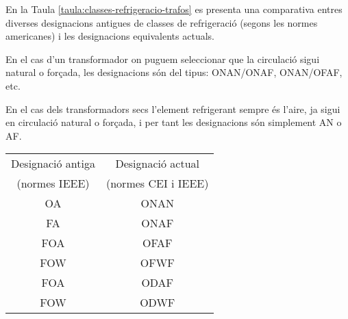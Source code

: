 En la Taula \vref{taula:classes-refrigeracio-trafos} es presenta una
comparativa entres diverses designacions antigues de classes de
refrigeració (segons les normes americanes) i les designacions
equivalents actuals.

En el cas d'un transformador on puguem seleccionar que la circulació
sigui natural o forçada,
les designacions són del tipus: ONAN/ONAF, ONAN/OFAF, etc.

En el cas dels transformadors secs l'element refrigerant sempre és
l'aire, ja sigui en circulació natural o forçada, i per tant les
designacions són simplement AN o AF.

\begin{center}
   \label{taula:classes-refrigeracio-trafos}
   \begin{tabular}{cc}
   \toprule[1pt]
   Designació antiga & Designació actual \\
   (normes IEEE)     & (normes CEI i IEEE) \\
   \midrule
   OA & ONAN   \\
   FA & ONAF   \\
   FOA & OFAF  \\
   FOW & OFWF  \\
   FOA & ODAF  \\
   FOW & ODWF \\
   \bottomrule[1pt]
   \end{tabular}
\end{center}




